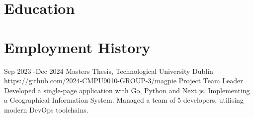 \documentclass[10pt]{article} %
\begin{document}

\section{Education}







\section{Employment History}

\job
{Sep 2023 -}{Dec 2024} {Masters Thesis, Technological University Dublin}
{https://github.com/2024-CMPU9010-GROUP-3/magpie} {Project Team Leader}
{Developed a single-page application with Go, Python and Next.js. Implementing a
Geographical Information System. Managed a team of 5 developers, utilising
modern DevOps toolchains.}
\end{document}
